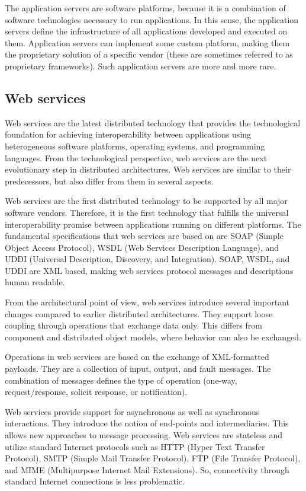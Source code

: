 The application servers are software platforms, because it is a combination of software technologies necessary to run applications. In this sense, the application servers define the infrastructure of all applications developed and executed on them. Application servers can implement some custom platform, making them the proprietary solution of a specific vendor (these are sometimes referred to as proprietary frameworks). Such application servers are more and more rare.

\subsection{Web services}
Web services are the latest distributed technology that provides the technological foundation for achieving interoperability between applications using heterogeneous software platforms, operating systems, and programming languages. From the technological perspective, web services are the next evolutionary step in distributed architectures. Web services are similar to their predecessors, but also differ from them in several aspects.

Web services are the first distributed technology to be supported by all major software vendors. Therefore, it is the first technology that fulfills the universal interoperability promise between applications running on different platforms. The fundamental specifications that web services are based on are SOAP (Simple Object Access Protocol), WSDL (Web Services Description Language), and UDDI (Universal Description, Discovery, and Integration). SOAP, WSDL, and UDDI are XML based, making web services protocol messages and descriptions human readable.

From the architectural point of view, web services introduce several important changes compared to earlier distributed architectures. They support loose coupling through operations that exchange data only. This differs from component and distributed object models, where behavior can also be exchanged.

Operations in web services are based on the exchange of XML-formatted payloads. They are a collection of input, output, and fault messages. The combination of messages defines the type of operation (one-way, request/response, solicit response, or notification). 

Web services provide support for asynchronous as well as synchronous interactions. They introduce the notion of end-points and intermediaries. This allows new approaches to message processing. Web services are stateless and utilize standard Internet protocols such as HTTP (Hyper Text Transfer Protocol), SMTP (Simple Mail Transfer Protocol), FTP (File Transfer Protocol), and MIME (Multipurpose Internet Mail Extensions). So, connectivity through standard Internet connections is less problematic.

